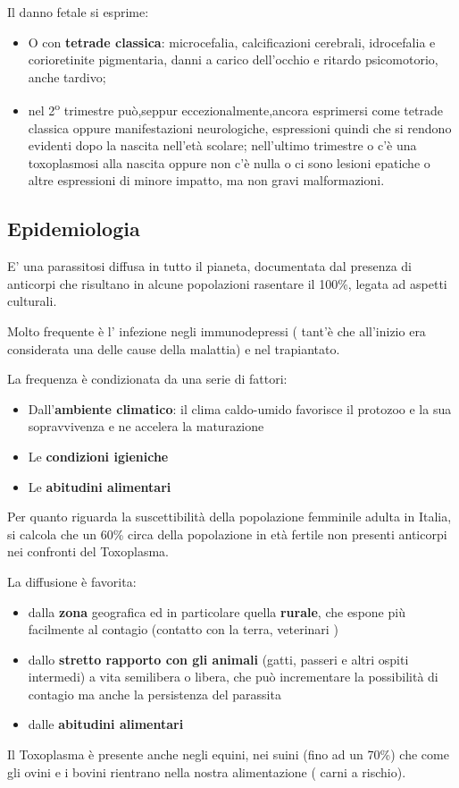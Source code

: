   Il danno fetale si esprime:

\begin{itemize}
\item
  O con \textbf{tetrade classica}: microcefalia, calcificazioni
  cerebrali, idrocefalia e corioretinite pigmentaria, danni a carico
  dell'occhio e ritardo psicomotorio, anche tardivo;
\item
  nel 2\textsuperscript{o} trimestre può,seppur eccezionalmente,ancora esprimersi come
  tetrade classica oppure manifestazioni neurologiche, espressioni
  quindi che si rendono evidenti dopo la nascita nell'età scolare;
  nell'ultimo trimestre o c'è una toxoplasmosi alla nascita oppure non
  c'è nulla o ci sono lesioni epatiche o altre espressioni di minore
  impatto, ma non gravi malformazioni.
\end{itemize}

\subsection{Epidemiologia}
  E' una parassitosi diffusa in tutto il pianeta, documentata dal
  presenza di anticorpi che risultano in alcune popolazioni rasentare il
  100\%, legata ad aspetti culturali.

  Molto frequente è l' infezione negli immunodepressi ( tant'è che
  all'inizio era considerata una delle cause della malattia) e nel
  trapiantato.

  La frequenza è condizionata da una serie di fattori:
  \begin{itemize}
  
\item
  Dall'\textbf{ambiente climatico}: il clima caldo-umido favorisce il
  protozoo e la sua sopravvivenza e ne accelera la maturazione
\item
  Le \textbf{condizioni igieniche}
\item
  Le \textbf{abitudini alimentari}
\end{itemize}
  Per quanto riguarda la suscettibilità della popolazione femminile
  adulta in Italia, si calcola che un 60\% circa della popolazione in
  età fertile non presenti anticorpi nei confronti del Toxoplasma.

  La diffusione è favorita:

\begin{itemize}
\item
  dalla \textbf{zona} geografica ed in particolare quella
  \textbf{rurale}, che espone più facilmente al contagio (contatto con
  la terra, veterinari )
\item
  dallo \textbf{stretto rapporto con gli animali} (gatti, passeri e
  altri ospiti intermedi) a vita semilibera o libera, che può
  incrementare la possibilità di contagio ma anche la persistenza del
  parassita
\item
  dalle \textbf{abitudini alimentari }
\end{itemize}
  Il Toxoplasma è presente anche negli equini, nei suini (fino ad un
  70\%) che come gli ovini e i bovini rientrano nella nostra
  alimentazione ( carni a rischio).

